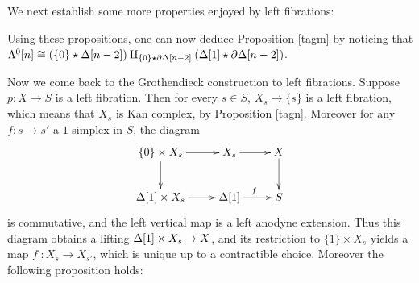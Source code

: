 



We next establish some more properties enjoyed by left fibrations:



Using these propositions, one can now deduce Proposition \ref{tagm} by noticing that 
$\Lambda^0[n]\cong(\{0\}\star\Delta[n-2])\amalg_{\{0\}\star\partial\Delta[n-2]}(\Delta[1]\star\partial\Delta[n-2])$.

Now we come back to the Grothendieck construction to left fibrations. Suppose $p:X\to S$ is a left fibration. Then for every $s\in S$,
$X_s\to\{s\}$ is a left fibration, which means that $X_s$ is Kan complex, by Proposition \ref{tagn}. Moreover for any $f:s\to s'$
a $1$-simplex in $S$, the diagram $$\xymatrix{\{0\}\times X_s\ar[r]\ar[d]&X_s\ar[r]&X\ar[d]\\\d[1]\times X_s\ar[r]&\d[1]\ar[r]^f&S}$$
is commutative, and the left vertical map is a left anodyne extension. Thus this diagram obtains a lifting $\Delta[1]\times X_s\to X$,
and its restriction to $\{1\}\times X_s$ yields a map $f_!:X_s\to X_{s'}$, which is unique up to a contractible choice.
Moreover the following proposition holds:

